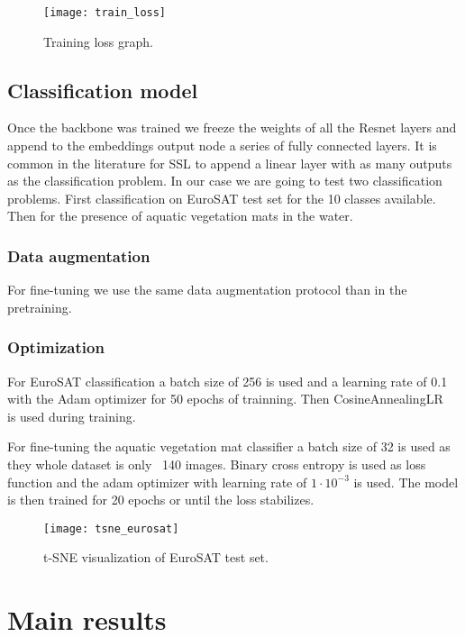 \documentclass[conference]{IEEEtran}
\begin{document}
    \begin{figure}[h]
        \centering
        \texttt{[image: train\_loss]}
        \caption{Training loss graph.}
        \label{fig:training_loss_graph}
    \end{figure}

    \subsection{Classification model}
    Once the backbone was trained we freeze the weights of all the Resnet layers and append to the embeddings output node a series of fully connected layers.
    It is common in the literature for SSL to append a linear layer with as many outputs as the classification problem.
    In our case we are going to test two classification problems.
    First classification on EuroSAT test set for the 10 classes available.
    Then for the presence of aquatic vegetation mats in the water.

    \subsubsection{Data augmentation}
    For fine-tuning we use the same data augmentation protocol than in the pretraining.

    \subsubsection{Optimization}
    For EuroSAT classification a batch size of 256 is used and a learning rate of 0.1 with the Adam optimizer for 50 epochs of trainning.
    Then CosineAnnealingLR~\cite{loshchilov2017sgdr} is used during training.

    For fine-tuning the aquatic vegetation mat classifier a batch size of 32 is used as they whole dataset is only ~140 images.
    Binary cross entropy is used as loss function and the adam optimizer with learning rate of $1\cdot10^{-3}$ is used.
    The model is then trained for 20 epochs or until the loss stabilizes.


    \begin{figure}[t]
        \centering
        \texttt{[image: tsne\_eurosat]}
        \caption{t-SNE visualization of EuroSAT test set.}
        \label{fig:tsne_eurosat}
    \end{figure}


    \section{Main results}
\end{document}
